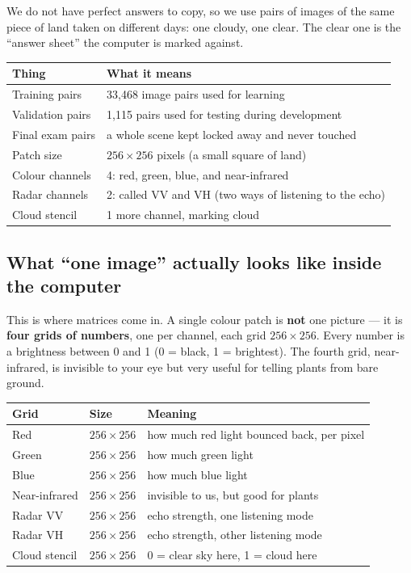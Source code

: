 \documentclass[11pt,a4paper]{article}
\begin{document}
We do not have perfect answers to copy, so we use pairs of images of the same piece of land taken
on different days: one cloudy, one clear. The clear one is the ``answer sheet'' the computer is
marked against.

\begin{center}
\begin{tabular}{@{}lp{9.5cm}@{}}
\hline
\textbf{Thing} & \textbf{What it means} \\
\hline
Training pairs & 33{,}468 image pairs used for learning \\
Validation pairs & 1{,}115 pairs used for testing during development \\
Final exam pairs & a whole scene kept locked away and never touched \\
Patch size & $256 \times 256$ pixels (a small square of land) \\
Colour channels & 4: red, green, blue, and near-infrared \\
Radar channels & 2: called VV and VH (two ways of listening to the echo) \\
Cloud stencil & 1 more channel, marking cloud \\
\hline
\end{tabular}
\end{center}

\subsection{What ``one image'' actually looks like inside the computer}

This is where matrices come in. A single colour patch is \textbf{not} one picture --- it is
\textbf{four grids of numbers}, one per channel, each grid $256 \times 256$. Every number is a
brightness between 0 and 1 (0 = black, 1 = brightest). The fourth grid, near-infrared, is invisible
to your eye but very useful for telling plants from bare ground.

\begin{center}
\begin{tabular}{@{}lll@{}}
\hline
Grid & Size & Meaning \\
\hline
Red & $256 \times 256$ & how much red light bounced back, per pixel \\
Green & $256 \times 256$ & how much green light \\
Blue & $256 \times 256$ & how much blue light \\
Near-infrared & $256 \times 256$ & invisible to us, but good for plants \\
Radar VV & $256 \times 256$ & echo strength, one listening mode \\
Radar VH & $256 \times 256$ & echo strength, other listening mode \\
Cloud stencil & $256 \times 256$ & 0 = clear sky here, 1 = cloud here \\
\hline
\end{tabular}
\end{center}
\end{document}
